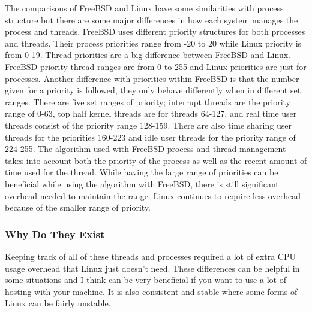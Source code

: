 \documentclass[draftclsnofoot, onecolumn, compsoc, 10pt]{IEEEtran}
\begin{document}
The comparisons of FreeBSD and Linux have some similarities with process structure but there are some major differences in how each system manages the process and threads. FreeBSD uses different priority structures for both processes and threads. Their process priorities range from -20 to 20 while Linux priority is from 0-19. Thread priorities are a big difference between FreeBSD and Linux. FreeBSD priority thread ranges are from 0 to 255 and Linux priorities are just for processes. Another difference with priorities within FreeBSD is that the number given for a priority is followed, they only behave differently when in different set ranges. There are five set ranges of priority; interrupt threads are the priority range of 0-63, top half kernel threads are for threads 64-127, and real time user threads consist of the priority range 128-159. There are also time sharing user threads for the priorities 160-223 and idle user threads for the priority range of 224-255\cite{freeBsdBook}. The algorithm used with FreeBSD process and thread management takes into account both the priority of the process as well as the recent amount of time used for the thread. While having the large range of priorities can be beneficial while using the algorithm with FreeBSD, there is still significant overhead needed to maintain the range. Linux continues to require less overhead because of the smaller range of priority. 

\subsubsection{Why Do They Exist}

Keeping track of all of these threads and processes required a lot of extra CPU usage overhead that Linux just doesn't need. These differences can be helpful in some situations and I think can be very beneficial if you want to use a lot of hosting with your machine. It is also consistent and stable where some forms of Linux can be fairly unstable.
\end{document}
